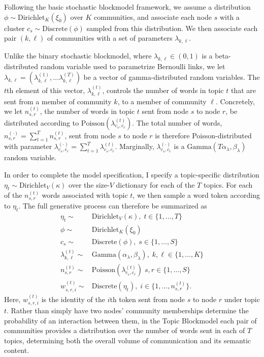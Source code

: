     Following the basic stochastic blockmodel framework, we assume a distribution $\phi\sim \mbox{Dirichlet}_K(\xi_0)$ over $K$ communities, and associate each node $s$ with a cluster $c_s \sim\mbox{Discrete}(\phi)$ sampled from this distribution. We then associate each pair $(k,\ell)$ of communities with a set of parameters $\lambda_{k,\ell}$.
    
    Unlike the binary stochastic blockmodel, where $\lambda_{k,\ell}\in (0,1)$ is a beta-distributed random variable used to parametrize Bernoulli links, we let $\lambda_{k,\ell}=(\lambda_{k,\ell}^{(1)},\dots  \lambda_{k,\ell}^{(T)})$ be a vector of gamma-distributed random variables. The $t$th element of this vector, $\lambda_{k,\ell}^{(t)}$, controls the number of words in topic $t$ that are sent from a member of community $k$, to a member of community $\ell$. Concretely, we let $n_{s,r}^{(t)}$, the number of words in topic $t$ sent from node $s$ to node $r$, be distributed according to $\mbox{Poisson}(\lambda_{c_s,c_r}^{(t)})$. The total number of words, $n_{s,r}^{(\cdot)} = \sum_{t=1}^Tn_{s,r}^{(t)}$, sent from node $s$ to node $r$ is therefore Poisson-distributed with parameter $\lambda_{c_s,c_r}^{(\cdot)}=\sum_{t=1}^T \lambda_{c_s,c_r}^{(t)}$. Marginally, $\lambda_{c_s, c_r}^{(\cdot)}$ is a $\mbox{Gamma}(T\alpha_\lambda, \beta_\lambda)$ random variable.
    
    In order to complete the model specification, I specify a topic-specific distribution $\eta_t \sim \mbox{Dirichlet}_V(\kappa)$ over the size-$V$ dictionary for each of the $T$ topics. For each of the $n_{s,r}^{(t)}$ words associated with topic $t$, we then sample a word token according to $\eta_t$. The full generative process can therefore be summarized as
    \begin{equation}
      \begin{aligned}
        \eta_t \sim& \mbox{Dirichlet}_V(\kappa),\; t\in \{1,\dots,T\}\\
        \phi \sim& \mbox{Dirichlet}_K(\xi_0)\\
        c_s \sim& \mbox{Discrete}(\phi),\; s\in\{1,\dots,S\}\\
        \lambda^{(t)}_{k,\ell}\sim& \mbox{Gamma}(\alpha_\lambda, \beta_\lambda),\; k,\ell \in\{1,\dots, K\}\\
        n_{s,r}^{(t)}\sim& \mbox{Poisson}(\lambda_{c_s,c_r}^{(t)})\; s,r \in\{1,\dots, S\}\\
        w_{s,r,i}^{(t)} \sim& \mbox{Discrete}(\eta_t),\; i\in\{1,\dots, n_{s,r}^{(t)}\}.
      \end{aligned}\label{eqn:PoisForm}
    \end{equation}
    Here, $w_{s,r,i}^{(t)}$ is the identity of the $i$th token sent from node $s$ to node $r$ under topic $t$. Rather than simply have two nodes' community memberships determine the probability of an interaction between them, in the Topic Blockmodel each pair of communities provides a distribution over the number of words sent in each of $T$ topics, determining both the overall volume of communication and its semantic content.
    
